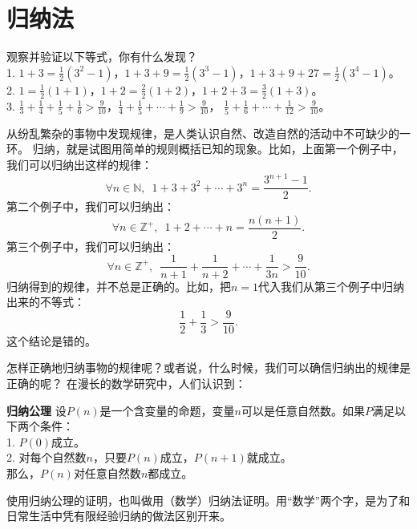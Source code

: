 \documentclass[12pt,UTF8]{ctexbook}
\begin{document}
\section{归纳法}
\begin{ex}\label{ex:2-2-0}
    观察并验证以下等式，你有什么发现？\\
    1. $1 + 3 = \frac12(3^2 - 1)$，$1 + 3 + 9 = \frac12(3^3 - 1)$，$1 + 3 + 9 + 27 = \frac12(3^4 - 1)$。\\
    2. $1 = \frac12(1+1)$，$1 + 2 = \frac22(1 + 2)$，$1 + 2 + 3 = \frac32(1 + 3)$。\\
    3. $\frac13 + \frac14 + \frac15 + \frac16 > \frac{9}{10}$，$\frac14 + \frac15 + \cdots + \frac{1}{9} > \frac{9}{10}$，
    $\frac15 + \frac16 + \cdots + \frac{1}{12} > \frac{9}{10}$。    
\end{ex}
从纷乱繁杂的事物中发现规律，是人类认识自然、改造自然的活动中不可缺少的一环。
归纳，就是试图用简单的规则概括已知的现象。比如，上面第一个例子中，我们可以归纳出这样的规律：
$$ \forall n \in \mathbb{N}, \,\,\, 1 + 3 + 3^2 + \cdots + 3^n = \frac{3^{n+1} - 1}{2}. $$
第二个例子中，我们可以归纳出：
$$ \forall n \in \mathbb{Z}^+, \,\,\, 1 + 2 + \cdots + n = \frac{n(n+1)}{2}. $$
第三个例子中，我们可以归纳出：
$$ \forall n \in \mathbb{Z}^+, \,\,\, \frac{1}{n+1} + \frac{1}{n+2} + \cdots + \frac{1}{3n} > \frac{9}{10}. $$
归纳得到的规律，并不总是正确的。比如，把$n=1$代入我们从第三个例子中归纳出来的不等式：
$$ \frac12 + \frac13 > \frac{9}{10}.$$
这个结论是错的。

怎样正确地归纳事物的规律呢？或者说，什么时候，我们可以确信归纳出的规律是正确的呢？
在漫长的数学研究中，人们认识到：
\begin{po}{\textbf{归纳公理}}
    设$P(n)$是一个含变量的命题，变量$n$可以是任意自然数。如果$P$满足以下两个条件：\\
    1. $P(0)$成立。\\
    2. 对每个自然数$n$，只要$P(n)$成立，$P(n+1)$就成立。\\
    那么，$P(n)$对任意自然数$n$都成立。
\end{po}
使用归纳公理的证明，也叫做用（数学）归纳法证明。用“数学”两个字，是为了和日常生活中凭有限经验归纳的做法区别开来。
\end{document}

